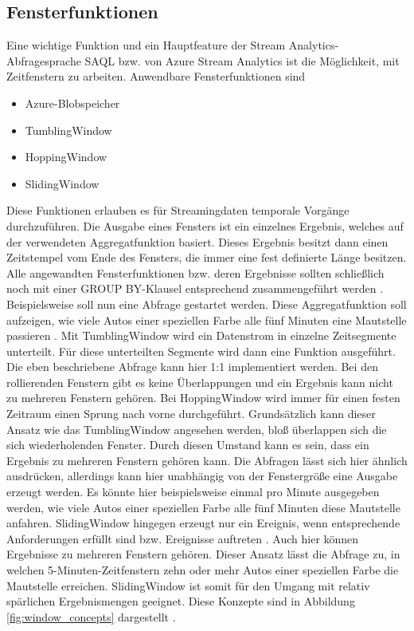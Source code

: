 \subsection{Fensterfunktionen}
Eine wichtige Funktion und ein Hauptfeature der Stream Analytics-Abfragesprache SAQL bzw. von Azure Stream Analytics ist die Möglichkeit, mit Zeitfenstern zu arbeiten. Anwendbare Fensterfunktionen sind \cite{Prosise.}
\begin{itemize}
	\item Azure-Blobspeicher 
	\item TumblingWindow
	\item HoppingWindow
	\item SlidingWindow
\end{itemize}
Diese Funktionen erlauben es für Streamingdaten temporale Vorgänge durchzuführen. Die Ausgabe eines Fensters ist ein einzelnes Ergebnis, welches auf der verwendeten Aggregatfunktion basiert. Dieses Ergebnis besitzt dann einen Zeitstempel vom Ende des Fensters, die immer eine fest definierte Länge besitzen. Alle angewandten Fensterfunktionen bzw. deren Ergebnisse sollten schließlich noch mit einer GROUP BY-Klausel entsprechend zusammengeführt werden \cite{Azure.2017}. 
Beispielsweise soll nun eine Abfrage gestartet werden. Diese Aggregatfunktion soll aufzeigen, wie viele Autos einer speziellen Farbe alle fünf Minuten eine Mautstelle passieren \cite{Prosise.}. Mit TumblingWindow wird ein Datenstrom in einzelne Zeitsegmente unterteilt. Für diese unterteilten Segmente wird dann eine Funktion ausgeführt. Die eben beschriebene Abfrage kann hier 1:1 implementiert werden. Bei den rollierenden Fenstern gibt es keine Überlappungen und ein Ergebnis kann nicht zu mehreren Fenstern gehören. Bei HoppingWindow wird immer für einen festen Zeitraum einen Sprung nach vorne durchgeführt. Grundsätzlich kann dieser Ansatz wie das TumblingWindow angesehen werden, bloß überlappen sich die sich wiederholenden Fenster. Durch diesen Umstand kann es sein, dass ein Ergebnis zu mehreren Fenstern gehören kann. Die Abfragen lässt sich hier ähnlich ausdrücken, allerdings kann hier unabhängig von der Fenstergröße eine Ausgabe erzeugt werden. Es könnte hier beispielsweise einmal pro Minute ausgegeben werden, wie viele Autos einer speziellen Farbe alle fünf Minuten diese Mautstelle anfahren. SlidingWindow hingegen erzeugt nur ein Ereignis, wenn entsprechende Anforderungen erfüllt sind bzw. Ereignisse auftreten \cite{Azure.2017}. Auch hier können Ergebnisse zu mehreren Fenstern gehören. Dieser Ansatz lässt die Abfrage zu, in welchen 5-Minuten-Zeitfenstern zehn oder mehr Autos einer speziellen Farbe die Mautstelle erreichen. SlidingWindow ist somit für den Umgang mit relativ spärlichen Ergebnismengen geeignet. Diese Konzepte sind in Abbildung \ref{fig:window_concepts} dargestellt \cite{Prosise.}.
\\ \\

